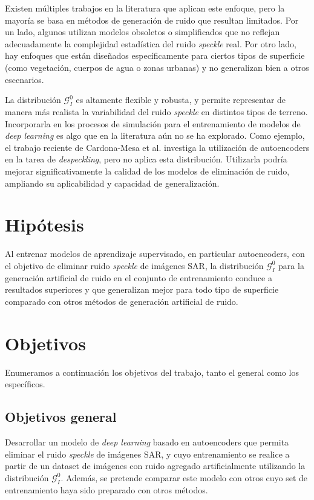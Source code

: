 Existen múltiples trabajos en la literatura que aplican este enfoque, pero la mayoría se basa en métodos de generación de ruido que resultan limitados. Por un lado, algunos utilizan modelos obsoletos o simplificados que no reflejan adecuadamente la complejidad estadística del ruido \emph{speckle} real. Por otro lado, hay enfoques que están diseñados específicamente para ciertos tipos de superficie (como vegetación, cuerpos de agua o zonas urbanas) y no generalizan bien a otros escenarios.

La distribución \( \mathcal{G}_I^0 \) \cite{originalGI0} es altamente flexible y robusta, y permite representar de manera más realista la variabilidad del ruido \emph{speckle} en distintos tipos de terreno. Incorporarla en los procesos de simulación para el entrenamiento de modelos de \emph{deep learning} es algo que en la literatura aún no se ha explorado. Como ejemplo, el trabajo reciente de Cardona-Mesa et al. \cite{cardona2025optimization} investiga la utilización de autoencoders en la tarea de \emph{despeckling}, pero no aplica esta distribución. Utilizarla podría mejorar significativamente la calidad de los modelos de eliminación de ruido, ampliando su aplicabilidad y capacidad de generalización.

\section{Hipótesis}

Al entrenar modelos de aprendizaje supervisado, en particular autoencoders, con el objetivo de eliminar ruido \emph{speckle} de imágenes SAR, la distribución \( \mathcal{G}_I^0 \) para la generación artificial de ruido en el conjunto de entrenamiento conduce a resultados superiores y que generalizan mejor para todo tipo de superficie comparado con otros métodos de generación artificial de ruido.

\section{Objetivos}

Enumeramos a continuación los objetivos del trabajo, tanto el general como los específicos.

\subsection{Objetivos general}

Desarrollar un modelo de \emph{deep learning} basado en autoencoders que permita eliminar el
ruido \emph{speckle} de imágenes SAR, y cuyo entrenamiento se realice a partir de un dataset de imágenes con ruido agregado artificialmente utilizando la distribución $\mathcal{G}_I^0$. Además, se
pretende comparar este modelo con otros cuyo set de entrenamiento haya sido preparado
con otros métodos.

